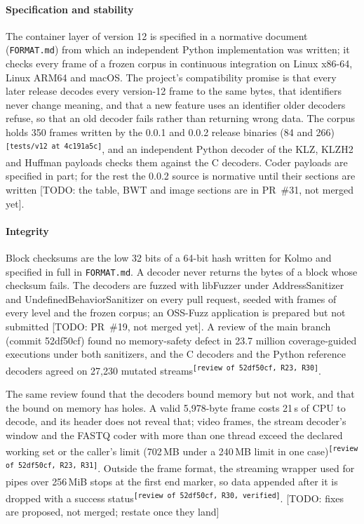 \documentclass[conference]{IEEEtran}
\newcommand{\src}[1]{\textsuperscript{\tiny\color{gray}\texttt{[#1]}}}
\newcommand{\todoin}[1]{{\color{red}\footnotesize[TODO: #1]}}
\newcommand{\src}[1]{}
\newcommand{\todoin}[1]{}
\begin{document}
\paragraph*{Specification and stability} The container layer of version 12 is specified in a normative document
(\texttt{FORMAT.md}) from which an independent Python implementation was written; it checks every frame of a frozen
corpus in continuous integration on Linux x86-64, Linux ARM64 and macOS. The project's compatibility promise is that
every later release decodes every version-12 frame to the same bytes, that identifiers never change meaning, and that
a new feature uses an identifier older decoders refuse, so that an old decoder fails rather than returning wrong
data. The corpus holds 350 frames written by the 0.0.1 and 0.0.2 release binaries (84 and 266)\src{tests/v12 at 4c191a5c},
and an independent Python decoder of the KLZ, KLZH2 and Huffman payloads checks them against the C decoders. Coder
payloads are specified in part; for the rest the 0.0.2 source is normative until their sections are written
\todoin{the table, BWT and image sections are in PR~\#31, not merged yet}.

\paragraph*{Integrity} Block checksums are the low 32 bits of a 64-bit hash written for Kolmo and specified in full
in \texttt{FORMAT.md}. A decoder never returns the bytes of a block whose checksum fails. The decoders are fuzzed
with libFuzzer under AddressSanitizer and UndefinedBehaviorSanitizer on every pull request, seeded with frames of
every level and the frozen corpus; an OSS-Fuzz application is prepared but not submitted
\todoin{PR~\#19, not merged yet}. A review of the main branch (commit 52df50cf) found no memory-safety defect in
23.7 million coverage-guided executions under both sanitizers, and the C decoders and the Python reference decoders
agreed on 27,230 mutated streams\src{review of 52df50cf, R23, R30}.

The same review found that the decoders bound memory but not work, and that the bound on memory has holes. A valid
5,978-byte frame costs 21\,s of CPU to decode, and its header does not reveal that; video frames, the stream decoder's window and the FASTQ coder with more than one
thread exceed the declared working set or the caller's limit (702\,MB under a 240\,MB limit in one case)\src{review of 52df50cf, R23, R31}. Outside the frame format, the streaming wrapper used for pipes over 256\,MiB stops at the first end marker, so
data appended after it is dropped with a success status\src{review of 52df50cf, R30, verified}.
\todoin{fixes are proposed, not merged; restate once they land}
\end{document}
